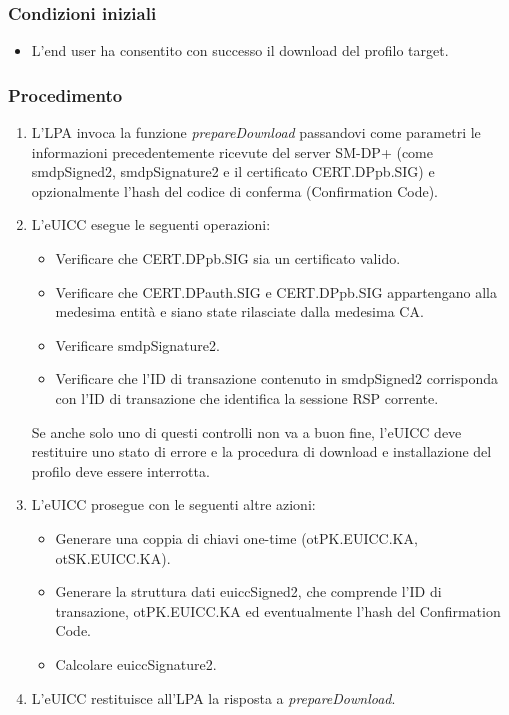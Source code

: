 \documentclass[10pt, oneside]{book}
\begin{document}
\subsubsection{Condizioni iniziali}
\begin{itemize}
\item L'end user ha consentito con successo il download del profilo target.
\end{itemize}

\subsubsection{Procedimento}
\begin{enumerate}
\item L'LPA invoca la funzione \textit{prepareDownload} passandovi come parametri le informazioni precedentemente ricevute del server SM-DP+ (come smdpSigned2, smdpSignature2 e il certificato CERT.DPpb.SIG) e opzionalmente l'hash del codice di conferma (Confirmation Code).
\item L'eUICC esegue le seguenti operazioni:
\begin{itemize}[itemsep=0pt]
\item Verificare che CERT.DPpb.SIG sia un certificato valido.
\item Verificare che CERT.DPauth.SIG e CERT.DPpb.SIG appartengano alla medesima entità e siano state rilasciate dalla medesima CA.
\item Verificare smdpSignature2.
\item Verificare che l'ID di transazione contenuto in smdpSigned2 corrisponda con l'ID di transazione che identifica la sessione RSP corrente.
\end{itemize}
Se anche solo uno di questi controlli non va a buon fine, l'eUICC deve restituire uno stato di errore e la procedura di download e installazione del profilo deve essere interrotta. 
\item L'eUICC prosegue con le seguenti altre azioni:
\begin{itemize}[itemsep=0pt]
\item Generare una coppia di chiavi one-time (otPK.EUICC.KA, otSK.EUICC.KA).
\item Generare la struttura dati euiccSigned2, che comprende l'ID di transazione, otPK.EUICC.KA ed eventualmente l'hash del Confirmation Code.
\item Calcolare euiccSignature2.
\end{itemize}
\item L'eUICC restituisce all'LPA la risposta a \textit{prepareDownload}.

\end{enumerate}
\end{document}
